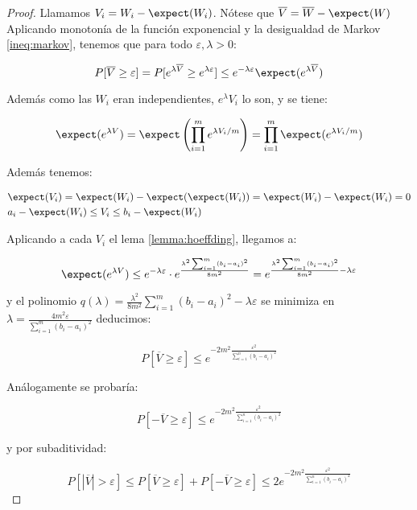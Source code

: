 \begin{proof}
 Llamamos $V_i = W_i - \expect(W_i)$. Nótese que $\overline{V} = \overline{W} - \expect(W)$
 Aplicando monotonía de la función exponencial y la desigualdad de Markov \ref{ineq:markov}, tenemos que 
 para todo $\varepsilon, \lambda > 0$:
 
 \[P[\overline{V} \ge \varepsilon] = P[e^{\lambda\overline{V}} \ge e^{\lambda \varepsilon}]
 \le e^{-\lambda \varepsilon} \expect(e^{\lambda \overline{V}})\]
 
 Además como las $W_i$ eran independientes, $e^\lambda V_i$ lo son, y se tiene:
 
 \[\expect(e^{\lambda V}) = \expect\left(\prod_{i=1}^m e^{\lambda V_i / m}\right) = \prod_{i=1}^m \expect(e^{\lambda V_i/m})\]
 
 Además tenemos:
 
 \begin{align*}
  & \expect(V_i) = \expect(W_i) - \expect(\expect(W_i)) = \expect(W_i) - \expect(W_i) = 0  \\
  & a_i-\expect(W_i) \le V_i \le b_i-\expect(W_i)
 \end{align*}
 
 Aplicando a cada $V_i$ el lema \ref{lemma:hoeffding}, llegamos a:
 
 \[\expect(e^{\lambda V}) \le e^{-\lambda \varepsilon} \cdot e^{\frac{\lambda^2 \sum_{i=1}^m(b_i-a_i)^2}{8m^2}} = 
  e^{\frac{\lambda^2 \sum_{i=1}^m(b_i-a_i)^2}{8m^2} - \lambda\varepsilon}\]
 
 y el polinomio $q(\lambda)= \frac{\lambda^2}{8m^2} \sum_{i=1}^m(b_i-a_i)^2 - \lambda\varepsilon$ se minimiza en 
 $\lambda = \frac{4m^2\varepsilon}{\sum_{i=1}^m(b_i-a_i)^2}$ deducimos:
 
 \[P[\overline{V} \ge \varepsilon] \le e^{-2m^2 \frac{\varepsilon^2}{\sum_{i=1}^n (b_i-a_i)^2}}\]
 
 Análogamente se probaría:
 
 \[P[-\overline{V} \ge \varepsilon] \le e^{-2m^2 \frac{\varepsilon^2}{\sum_{i=1}^n (b_i-a_i)^2}}\]
 
 
 y por subaditividad: 
 
 \[P[|\overline{V}| > \varepsilon] \le P[\overline{V} \ge \varepsilon] + P[-\overline{V} \ge \varepsilon]
 \le 2e^{-2m^2 \frac{\varepsilon^2}{\sum_{i=1}^n (b_i-a_i)^2}}\]
 
\end{proof}
